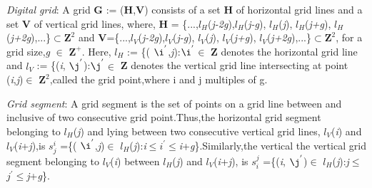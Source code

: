 \documentclass[12pt]{article}
\begin{document}
\textit{Digital grid}: A grid \textbf{G} := (\textbf{H},\textbf{V}) consists of a set \textbf{H} of horizontal grid lines and a set \textbf{V} of vertical grid lines, where, \textbf{H} = \{...,${\textit{l}}_H$(\textit{j-2g}),${\textit{l}}_H$(\textit{j-g}), ${\textit{l}}_H$(\textit{j}), ${\textit{l}}_H$(\textit{j+g}), ${\textit{l}}_H$(\textit{j+2g}),...\}{$\subset $$\textbf{Z}^2$} and \textbf{V}=\{...,${\textit{l}}_V$(\textit{j-2g}),${\textit{l}}_V$(\textit{j-g}), ${\textit{l}}_V$(\textit{j}), ${\textit{l}}_V$(\textit{j+g}), ${\textit{l}}_V$(\textit{j+2g}),...\}{$\subset $$\textbf{Z}^2$}, for a grid size,\textit{g} $\in$ {$\textbf{Z}^+$}. Here, ${\textit{l}}_H$ := \{(\textit{ $\i^{'}$},\textit{j}):\textit{$\i^{'}$}$\in$ \textbf{Z} denotes the horizontal grid line and ${\textit{l}}_V$ := \{(\textit{i},\textit{ $\j^{'}$}):\textit{$\j^{'}$}$\in$ \textbf{Z} denotes the vertical grid line intersecting at point (\textit{i},\textit{j})$\in$ $\textbf{Z}^2$,called the grid point,where i and j multiples of g.
\break


\textit{Grid segment}: A grid segment is the set of points on a grid line between and inclusive of two consecutive grid point.Thus,the horizontal grid segment belonging to ${\textit{l}}_H$(\textit{j}) and lying between two consecutive vertical grid lines, ${\textit{l}}_V$(\textit{i}) and ${\textit{l}}_V$(\textit{i}+\textit{j}),is  \textit{$s_j^{i}$} =\{(\textit{ $\i^{'}$},\textit{j})$\in$ ${\textit{l}}_H$(\textit{j}):\textit{i}$\leq$\textit{$i^{'}$}$\leq$\textit{i}+\textit{g}\}.Similarly,the vertical the vertical grid segment belonging to ${\textit{l}}_V$(\textit{i}) between ${\textit{l}}_H$(\textit{j}) and ${\textit{l}}_V$(\textit{i}+\textit{j}), is \textit{$s_i^{j}$} =\{(\textit{i},\textit{ $\j^{'}$})$\in$ ${\textit{l}}_H$(\textit{j}):\textit{j}$\leq$\textit{$j^{'}$}$\leq$\textit{j}+\textit{g}\}.
\break
\end{document}

